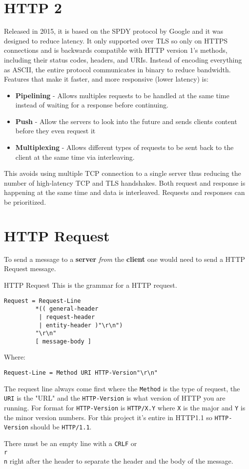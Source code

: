 \documentclass[../CMPUT-404-Notes.tex]{subfiles}
\begin{document}
\section{HTTP 2}
Released in 2015, it is based on the SPDY protocol by Google and it was designed to reduce latency. 
It only supported over TLS so only on HTTPS connections and is backwards compatible with HTTP version 1's methods, including their status codes, headers, and URIs.
Instead of encoding everything as ASCII, the entire protocol communicates in binary to reduce bandwidth. 
Features that make it faster, and more responsive (lower latency) is:
\begin{itemize}
  \item \textbf{Pipelining} - Allows multiples requests to be handled at the same time instead of waiting for a response before continuing. 
  \item \textbf{Push} - Allow the servers to look into the future and sends clients content before they even request it 
  \item \textbf{Multiplexing} - Allows different types of requests to be sent back to the client at the same time via interleaving.
\end{itemize}

This avoids using multiple TCP connection to a single server thus reducing the number of high-latency TCP and TLS handshakes.
Both request and response is happening at the same time and data is interleaved. Requests and responses can be prioritized.

\section{HTTP Request}
To send a message to a \textbf{server} \emph{from} the \textbf{client} one would need to send a HTTP Request message.
\newpage

\begin{Definition}{HTTP Request}
This is the grammar for a HTTP request.
\begin{verbatim}
Request = Request-Line              
         *(( general-header        
          | request-header         
          | entity-header )"\r\n")  
         "\r\n"
         [ message-body ]          
\end{verbatim}
Where: 
\begin{verbatim}
Request-Line = Method URI HTTP-Version"\r\n"  
\end{verbatim}
The request line always come first where the \texttt{Method} is the type of request, the \texttt{URI} is the "URL" and the \texttt{HTTP-Version} is what version of HTTP you are running.
For format for \texttt{HTTP-Version} is \texttt{HTTP/X.Y} where \texttt{X} is the major and \texttt{Y} is the minor version numbers.
For this project it's entire in HTTP1.1 so \texttt{HTTP-Version} should be \texttt{HTTP/1.1}.

There must be an empty line with a \texttt{CRLF} or \texttt{\\r\\n} right after the header to separate the header and the body of the message.
\end{Definition}
\end{document}
